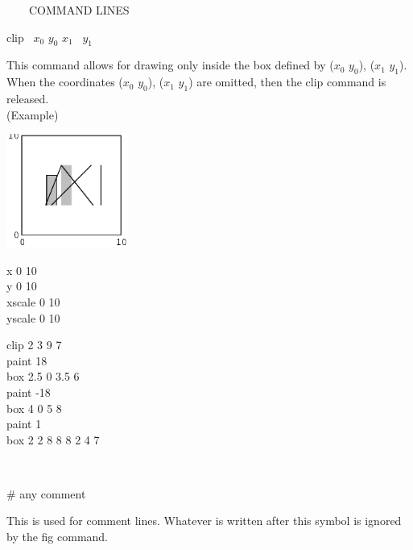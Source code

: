 \begin{qsection}{\ ~~~COMMAND LINES}
\begin{minipage}[t]{5.5cm}
clip ~$x_0$ $y_0$ $x_1$ ~$y_1$ 
\end{minipage}
\begin{minipage}[t]{9cm}
This command allows for drawing only inside the box defined by
($x_0$ $y_0$), ($x_1$ $y_1$).
When the coordinates ($x_0$ $y_0$), ($x_1$ $y_1$) are omitted,
then the clip command is released.\\

(Example)\\
\begin{minipage}[t]{4.3cm}
 \includegraphics[width=4cm]{fig/clip.eps}
\end{minipage}
\begin{minipage}[b]{4.5cm}
\baselineskip 5pt
x 0 10\\
y 0 10\\
xscale 0 10\\
yscale 0 10

\vspace*{3mm}
clip 2 3 9 7\\
paint 18\\
box 2.5 0 3.5 6\\
paint -18 \\
box 4 0 5 8\\
paint 1\\
box  2 2 8 8 8 2 4 7
\end{minipage}
\end{minipage}\\

\begin{minipage}[t]{5.5cm}
\# any comment
\end{minipage}
\begin{minipage}[t]{9cm}
This is used for comment lines.
Whatever is written after this symbol
is ignored by the fig command.
\end{minipage}\\
\end{qsection}

